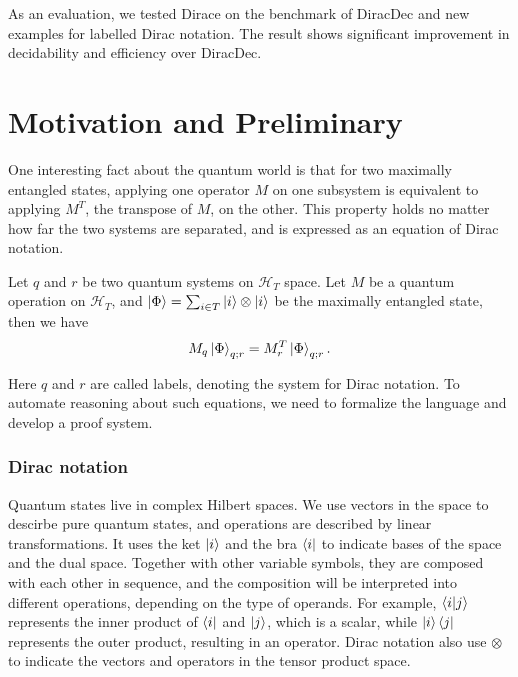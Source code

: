 \documentclass[runningheads]{llncs}
\newcommand{\yx}[1]{\textit{\color{blue}[YX] : #1}}
\begin{document}
As an evaluation, we tested Dirace on the benchmark of DiracDec and new examples for labelled Dirac notation. 
The result shows significant improvement in decidability and efficiency over DiracDec.






\section{Motivation and Preliminary}
One interesting fact about the quantum world is that for two maximally entangled states, applying one operator $M$ on one subsystem is equivalent to applying $M^T$, the transpose of $M$, on the other. This property holds no matter how far the two systems are separated, and is expressed as an equation of Dirac notation.
\begin{example}
    \label{ex: motivating}
    Let $q$ and $r$ be two quantum systems on $\mathcal{H}_T$ space. Let $M$ be a quantum operation on $\mathcal{H}_T$,
    and $\ket{\Phi} = \sum_{i \in T} \ket{i}\otimes \ket{i}$ be the maximally entangled state, then we have
    \[
    M_q \ket{\Phi}_{q; r} = M_r^T \ket{\Phi}_{q; r}.
    \]
\end{example}
Here $q$ and $r$ are called labels, denoting the system for Dirac notation.
To automate reasoning about such equations, we need to formalize the language and develop a proof system.

\subsubsection{Dirac notation}
Quantum states live in complex Hilbert spaces. We use vectors in the space to descirbe pure quantum states, and operations are described by linear transformations. 
It uses the ket $\ket{i}$ and the bra $\bra{i}$ to indicate bases of the space and the dual space. Together with other variable symbols, they are composed with each other in sequence, and the composition will be interpreted into different operations, depending on the type of operands. For example, $\braket{i|j}$ represents the inner product of $\bra{i}$ and $\ket{j}$, which is a scalar, while $\ket{i}\bra{j}$ represents the outer product, resulting in an operator. 
Dirac notation also use $\otimes$ to indicate the vectors and operators in the tensor product space.
\end{document}
